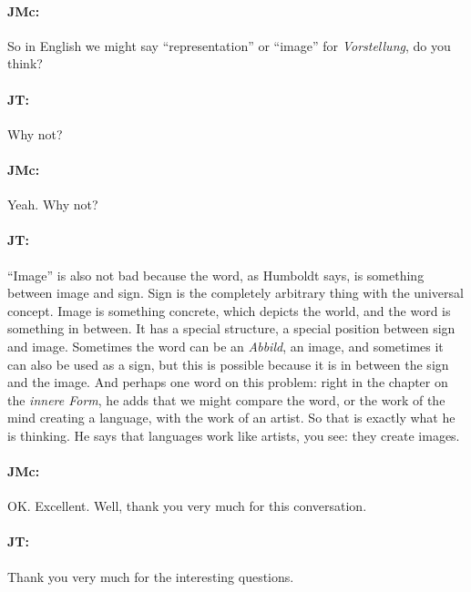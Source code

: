 \documentclass[output=paper]{langscibook}
\begin{document}
\paragraph*{JMc:} So in English we might say “representation” or “image” for \textit{Vorstellung}, do you think?


\paragraph*{JT:} Why not?


\paragraph*{JMc:} Yeah. Why not?


\paragraph*{JT:} ``Image'' is also not bad because the word, as Humboldt says, is something between image and sign. Sign is the completely arbitrary thing with the universal concept. Image is something concrete, which depicts the world, and the word is something in between. It has a special structure, a special position between sign and image. Sometimes the word can be an \textit{Abbild}, an image, and sometimes it can also be used as a sign, but this is possible because it is in between the sign and the image. And perhaps one word on this problem: right in the chapter on the \textit{innere Form}, he adds that we might compare the word, or the work of the mind creating a language, with the work of an artist. So that is exactly what he is thinking. He says that languages work like artists, you see: they create images.


\paragraph*{JMc:} OK. Excellent. Well, thank you very much for this conversation.


\paragraph*{JT:} Thank you very much for the interesting questions.

\nocite{bopp1816a}
\nocite{bopp1820a}
\nocite{bopp1845a}
\nocite{bopp1857a}
\nocite{grimm1819a}
\nocite{grimm1822a}
\nocite{grimm1854a}
\nocite{humboldt1836a}
\nocite{humboldt1988a}
\nocite{humboldt1994a}
\nocite{humboldt1997a}
\nocite{humboldt2012a}
\nocite{schlegel1808a}
\nocite{schlegel1900a}
\nocite{schleicher1850a}
\nocite{schleicher1863a}
\nocite{schleicher1869a}
\nocite{vossler1904a}
\nocite{aarsleff2016a}
\nocite{mcelvenny2016a}
\nocite{mcelvenny2018b}
\nocite{mueller-vollmer2017a}
\nocite{ringmacher1996a}
\nocite{trabant1986a}
\nocite{trabant1992a}
\nocite{trabant2012a}
\nocite{trabant2015a}
\nocite{trabant2020a}
\sloppy
\PrintPrimarySources{}
\PrintSecondarySources{}
\end{document}
